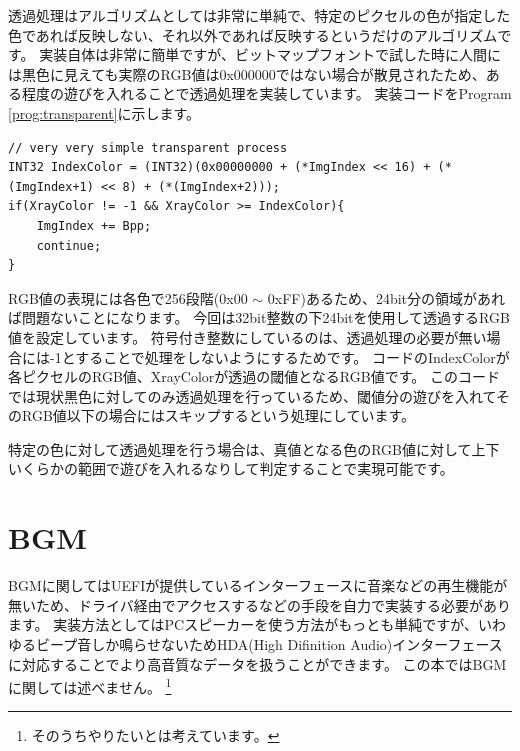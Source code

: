 \documentclass[10pt,b5paper,twoside,openany]{ltjsbook}
\begin{document}
透過処理はアルゴリズムとしては非常に単純で、特定のピクセルの色が指定した色であれば反映しない、それ以外であれば反映するというだけのアルゴリズムです。
実装自体は非常に簡単ですが、ビットマップフォントで試した時に人間には黒色に見えても実際のRGB値は0x000000ではない場合が散見されたため、ある程度の遊びを入れることで透過処理を実装しています。
実装コードをProgram \ref{prog:transparent}に示します。
\begin{lstlisting}[style=customC,caption=Transparent process,label=prog:transparent]
// very very simple transparent process
INT32 IndexColor = (INT32)(0x00000000 + (*ImgIndex << 16) + (*(ImgIndex+1) << 8) + (*(ImgIndex+2)));
if(XrayColor != -1 && XrayColor >= IndexColor){
    ImgIndex += Bpp;
    continue;
} 
\end{lstlisting}
RGB値の表現には各色で256段階(0x00 $\sim$ 0xFF)あるため、24bit分の領域があれば問題ないことになります。
今回は32bit整数の下24bitを使用して透過するRGB値を設定しています。
符号付き整数にしているのは、透過処理の必要が無い場合には-1とすることで処理をしないようにするためです。
コードのIndexColorが各ピクセルのRGB値、XrayColorが透過の閾値となるRGB値です。
このコードでは現状黒色に対してのみ透過処理を行っているため、閾値分の遊びを入れてそのRGB値以下の場合にはスキップするという処理にしています。

特定の色に対して透過処理を行う場合は、真値となる色のRGB値に対して上下いくらかの範囲で遊びを入れるなりして判定することで実現可能です。

\section{BGM}
BGMに関してはUEFIが提供しているインターフェースに音楽などの再生機能が無いため、ドライバ経由でアクセスするなどの手段を自力で実装する必要があります。
実装方法としてはPCスピーカーを使う方法がもっとも単純ですが、いわゆるビープ音しか鳴らせないためHDA(High Difinition Audio)インターフェースに対応することでより高音質なデータを扱うことができます。
この本ではBGMに関しては述べません。
\footnote{そのうちやりたいとは考えています。}
\end{document}
